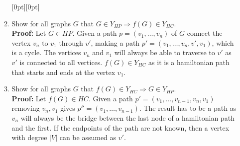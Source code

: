 \documentclass[11pt,a4paper]{article}
\newcommand{\hc} {HC}
\newcommand{\hp} {HP}
\begin{document}
\begin{enumerate}
\begin{enumerate}
\begin{center}
                \raisebox{20mm}[0pt][0pt]{%
                \makebox[1em][c]{$\Rightarrow$}}
            \end{center}
            \item Show for all graphs $G$ that $G \in Y_{\hp{}} \Rightarrow f(G) \in Y_{\hc{}}$.\\
            \textbf{Proof:} Let $G \in \hp{}$.
            Given a path $p = (v_1, \ldots, v_n)$ of $G$ connect the vertex $v_n$ to $v_1$ through $v'$,
              making a path $p' = (v_1, \ldots, v_n, v', v_1)$, which is a cycle.
               The vertices $v_n$ and $v_1$ will always be able to traverse to $v'$
                as $v'$ is connected to all vertices. $f(G) \in Y_{\hc{}}$ as it is a hamiltonian path that starts and ends at the vertex $v_1$.\\
            
            \item Show for all graphs $G$ that $f(G) \in Y_{\hc{}} \Rightarrow G \in Y_{\hp{}}$.\\
            \textbf{Proof:} Let $f(G) \in \hc{}$. Given a path $p' = (v_1, \ldots, v_{n-1}, v_n, v_1)$ removing $v_n, v_1$ gives $p'' = (v_1, \ldots, v_{n-1})$.
            The result has to be a path as $v_n$ will always be the bridge between the last node of a hamiltonian path and the first. If the endpoints of the path are not known, then a vertex with degree $|V|$ can be assumed as $v'$.
            

\end{enumerate}
\end{enumerate}
\end{document}
